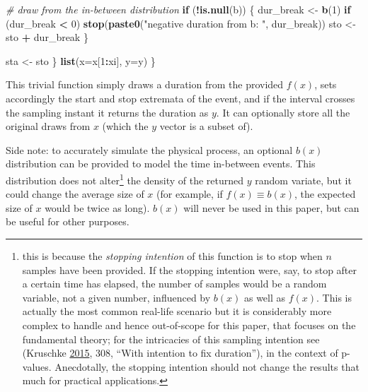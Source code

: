 \documentclass[]{article}
\newenvironment{Shaded}{\begin{snugshade}}{\end{snugshade}}
\newcommand{\CommentTok}[1]{\textcolor[rgb]{0.56,0.35,0.01}{\textit{#1}}}
\newcommand{\ControlFlowTok}[1]{\textcolor[rgb]{0.13,0.29,0.53}{\textbf{#1}}}
\newcommand{\DataTypeTok}[1]{\textcolor[rgb]{0.13,0.29,0.53}{#1}}
\newcommand{\DecValTok}[1]{\textcolor[rgb]{0.00,0.00,0.81}{#1}}
\newcommand{\KeywordTok}[1]{\textcolor[rgb]{0.13,0.29,0.53}{\textbf{#1}}}
\newcommand{\NormalTok}[1]{#1}
\newcommand{\OperatorTok}[1]{\textcolor[rgb]{0.81,0.36,0.00}{\textbf{#1}}}
\newcommand{\StringTok}[1]{\textcolor[rgb]{0.31,0.60,0.02}{#1}}
\begin{document}
\begin{Shaded}
\begin{Highlighting}[]
    \CommentTok{# draw from the in-between distribution}
    \ControlFlowTok{if}\NormalTok{ (}\OperatorTok{!}\KeywordTok{is.null}\NormalTok{(b)) \{}
\NormalTok{      dur_break <-}\StringTok{ }\KeywordTok{b}\NormalTok{(}\DecValTok{1}\NormalTok{)}
      \ControlFlowTok{if}\NormalTok{ (dur_break }\OperatorTok{<}\StringTok{ }\DecValTok{0}\NormalTok{) }\KeywordTok{stop}\NormalTok{(}\KeywordTok{paste0}\NormalTok{(}\StringTok{"negative duration from b: "}\NormalTok{, dur_break))}
\NormalTok{      sto <-}\StringTok{ }\NormalTok{sto }\OperatorTok{+}\StringTok{ }\NormalTok{dur_break}
\NormalTok{    \}}
    
\NormalTok{    sta <-}\StringTok{ }\NormalTok{sto}
\NormalTok{  \}}
  \KeywordTok{list}\NormalTok{(}\DataTypeTok{x=}\NormalTok{x[}\DecValTok{1}\OperatorTok{:}\NormalTok{xi], }\DataTypeTok{y=}\NormalTok{y)}
\NormalTok{\}}
\end{Highlighting}
\end{Shaded}

This trivial function simply draws a duration from the provided
\(f(x)\), sets accordingly the start and stop extremata of the event,
and if the interval crosses the sampling instant it returns the duration
as \(y\). It can optionally store all the original draws from \(x\)
(which the \(y\) vector is a subset of).

Side note: to accurately simulate the physical process, an optional
\(b(x)\) distribution can be provided to model the time in-between
events. This distribution does not alter\footnote{this is because the
  \emph{stopping intention} of this function is to stop when \(n\)
  samples have been provided. If the stopping intention were, say, to
  stop after a certain time has elapsed, the number of samples would be
  a random variable, not a given number, influenced by \(b(x)\) as well
  as \(f(x)\). This is actually the most common real-life scenario but
  it is considerably more complex to handle and hence out-of-scope for
  this paper, that focuses on the fundamental theory; for the
  intricacies of this sampling intention see (Kruschke
  \protect\hyperlink{ref-DBDA2E}{2015}, 308, ``With intention to fix
  duration''), in the context of p-values. Anecdotally, the stopping
  intention should not change the results that much for practical
  applications.} the density of the returned \(y\) random variate, but
it could change the average size of \(x\) (for example, if
\(f(x) \equiv b(x)\), the expected size of \(x\) would be twice as
long). \(b(x)\) will never be used in this paper, but can be useful for
other purposes.
\end{document}
